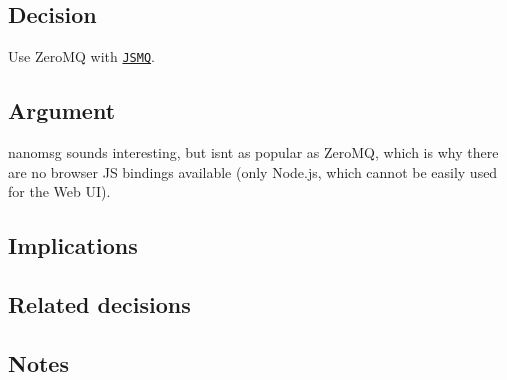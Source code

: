 \subsection*{Decision}

Use Zero\+MQ with \href{https://github.com/zeromq/JSMQ}{\tt J\+S\+MQ}.

\subsection*{Argument}

nanomsg sounds interesting, but isn\textquotesingle{}t as popular as Zero\+MQ, which is why there are no browser JS bindings available (only Node.\+js, which cannot be easily used for the Web UI).

\subsection*{Implications}

\subsection*{Related decisions}

\subsection*{Notes}